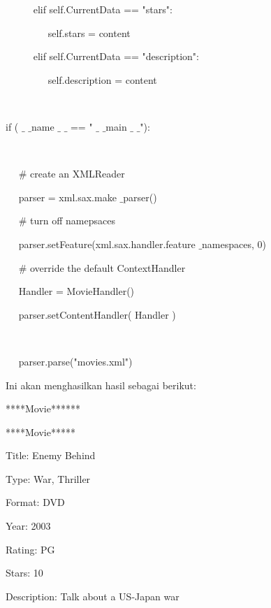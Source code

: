 \noindent 
~~~~~ elif self.CurrentData == "stars": \par
\noindent 
~~~~~~~~ self.stars = content \par
\noindent 
~~~~~ elif self.CurrentData == "description": \par
\noindent 
~~~~~~~~ self.description = content \par
\noindent 
~  \par
\noindent 
if (  $  \_  $ $  \_  $name $  \_  $ $  \_  $ == " $  \_  $ $  \_  $main $  \_  $ $  \_  $"): \par
\noindent 
~~  \par
\noindent 
~~  $  \#  $ create an XMLReader \par
\noindent 
~~ parser = xml.sax.make $  \_  $parser() \par
\noindent 
~~  $  \#  $ turn off namepsaces \par
\noindent 
~~ parser.setFeature(xml.sax.handler.feature $  \_  $namespaces, 0) \par
\vspace{12pt}
\noindent 
~~  $  \#  $ override the default ContextHandler \par
\noindent 
~~ Handler = MovieHandler() \par
\noindent 
~~ parser.setContentHandler( Handler ) \par
\noindent 
~~  \par
\noindent 
~~ parser.parse("movies.xml") \par
\vspace{12pt}
\vspace{12pt}
\noindent 
Ini akan menghasilkan hasil sebagai berikut: \par
\noindent 
{\fontsize{10pt}{10pt}\selectfont *****Movie******} \par
\noindent 
{\fontsize{10pt}{10pt}\selectfont *****Movie*****} \par
\noindent 
{\fontsize{10pt}{10pt}\selectfont Title: Enemy Behind} \par
\noindent 
{\fontsize{10pt}{10pt}\selectfont Type: War, Thriller} \par
\noindent 
{\fontsize{10pt}{10pt}\selectfont Format: DVD} \par
\noindent 
{\fontsize{10pt}{10pt}\selectfont Year: 2003} \par
\noindent 
{\fontsize{10pt}{10pt}\selectfont Rating: PG} \par
\noindent 
{\fontsize{10pt}{10pt}\selectfont Stars: 10} \par
\noindent 
{\fontsize{10pt}{10pt}\selectfont Description: Talk about a US-Japan war} \par
